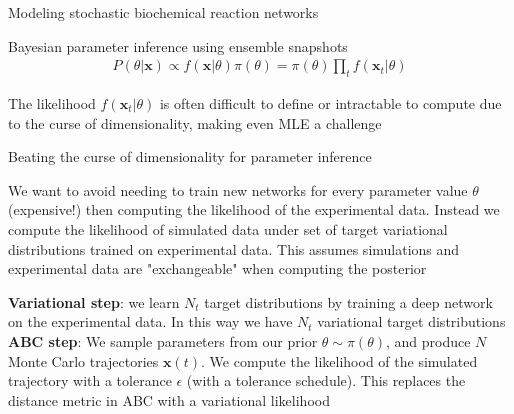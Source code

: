 \documentclass[aspectratio=1610]{beamer}					%
\begin{document}
\begin{section}{Modeling stochastic biochemical reaction networks}
\begin{frame}{Bayesian parameter inference using ensemble snapshots}
\begin{align*}
P(\theta|\mathbf{x}) \propto f(\mathbf{x}|\theta)\pi(\theta) = \pi(\theta)\prod_{t} f(\mathbf{x}_{t}|\theta)
\end{align*}

The likelihood $f(\mathbf{x}_{t}|\theta)$ is often difficult to define or intractable to compute due to the curse of dimensionality, making even MLE a challenge

\end{frame}


\end{section}

\begin{frame}{Beating the curse of dimensionality for parameter inference}

We want to avoid needing to train new networks for every parameter value $\theta$ (expensive!) then computing the likelihood of the experimental data. Instead we compute the likelihood of simulated data under set of target variational distributions trained on experimental data. This assumes simulations and experimental data are "exchangeable" when computing the posterior

\vspace{0.2in}
\textbf{Variational step}: we learn $N_{t}$ target distributions by training a deep network on the experimental data. In this way we have $N_{t}$ variational target distributions\\
\vspace{0.2in}
\textbf{ABC step}: We sample parameters from our prior $\theta \sim \pi(\theta)$, and produce $N$ Monte Carlo trajectories $\mathbf{x}(t)$. We compute the likelihood of the simulated trajectory with a tolerance $\epsilon$ (with a tolerance schedule). This replaces the distance metric in ABC with a variational likelihood

\end{frame}

\begin{frame}

\end{frame}
\end{document}
